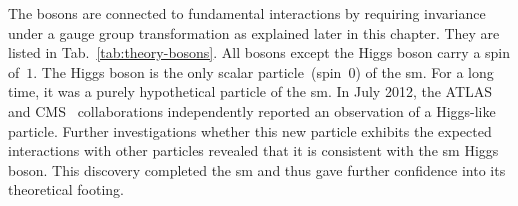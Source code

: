 

The bosons are connected to fundamental interactions by requiring invariance under a gauge group transformation as explained later in this chapter. They are listed in Tab.~\ref{tab:theory-bosons}. All bosons except the Higgs boson carry a spin of~$1$. The Higgs boson is the only scalar particle~(spin~$0$) of the \gls{sm}. For a long time, it was a purely hypothetical particle of the \gls{sm}. In July 2012, the ATLAS~\cite{Aad:2012tfa} and CMS~\cite{Chatrchyan:2012xdj} collaborations independently reported an observation of a Higgs-like particle. Further investigations whether this new particle exhibits the expected interactions with other particles revealed that it is consistent with the \gls{sm} Higgs~\cite{Khachatryan:2016vau} boson. This discovery completed the \gls{sm} and thus gave further confidence into its theoretical footing.


